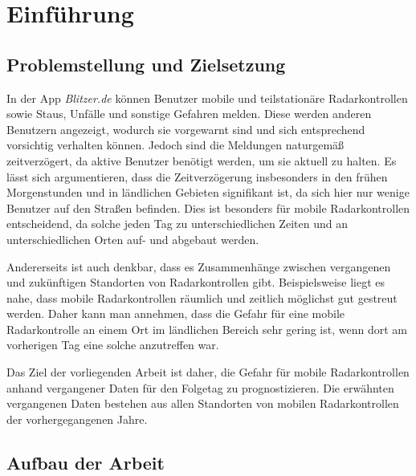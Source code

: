 \section{Einführung}
\label{sec:Einführung}

\subsection{Problemstellung und Zielsetzung}
\label{sec:Problemstellung}
In der App \emph{Blitzer.de} können Benutzer mobile und teilstationäre Radarkontrollen sowie Staus, Unfälle und sonstige Gefahren melden.
Diese werden anderen Benutzern angezeigt, wodurch sie vorgewarnt sind und sich entsprechend vorsichtig verhalten können.
Jedoch sind die Meldungen naturgemäß zeitverzögert, da aktive Benutzer benötigt werden, um sie aktuell zu halten.
Es lässt sich argumentieren, dass die Zeitverzögerung insbesonders in den frühen Morgenstunden und in ländlichen Gebieten signifikant ist,
da sich hier nur wenige Benutzer auf den Straßen befinden.
Dies ist besonders für mobile Radarkontrollen entscheidend, da solche jeden Tag zu unterschiedlichen Zeiten und an unterschiedlichen Orten auf- und abgebaut werden.

Andererseits ist auch denkbar, dass es Zusammenhänge zwischen vergangenen und zukünftigen Standorten von Radarkontrollen gibt.
Beispielsweise liegt es nahe, dass mobile Radarkontrollen räumlich und zeitlich möglichst gut gestreut werden.
Daher kann man annehmen, dass die Gefahr für eine mobile Radarkontrolle an einem Ort im ländlichen Bereich sehr gering ist, wenn dort am vorherigen Tag eine solche anzutreffen war.

Das Ziel der vorliegenden Arbeit ist daher, die Gefahr für mobile Radarkontrollen anhand vergangener Daten für den Folgetag zu prognostizieren.
Die erwähnten vergangenen Daten bestehen aus allen Standorten von mobilen Radarkontrollen der vorhergegangenen Jahre.




\subsection{Aufbau der Arbeit}
\label{sec:Aufbau}



